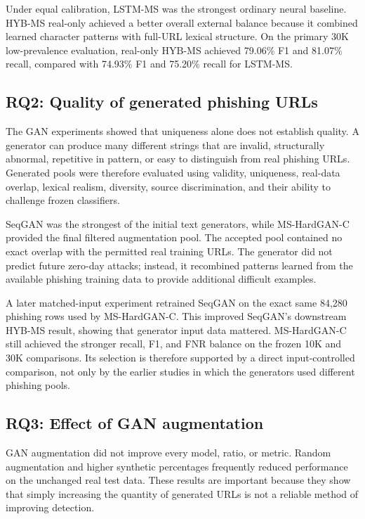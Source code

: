 Under equal calibration, LSTM-MS was the strongest ordinary neural baseline.
HYB-MS real-only achieved a better overall external balance because it combined
learned character patterns with full-URL lexical structure. On the primary
30K low-prevalence evaluation, real-only HYB-MS achieved 79.06\% F1 and
81.07\% recall, compared with 74.93\% F1 and 75.20\% recall for LSTM-MS.

\subsection{RQ2: Quality of generated phishing URLs}

The GAN experiments showed that uniqueness alone does not establish quality.
A generator can produce many different strings that are invalid, structurally
abnormal, repetitive in pattern, or easy to distinguish from real phishing
URLs. Generated pools were therefore evaluated using validity, uniqueness,
real-data overlap, lexical realism, diversity, source discrimination, and
their ability to challenge frozen classifiers.

SeqGAN was the strongest of the initial text generators, while MS-HardGAN-C
provided the final filtered augmentation pool. The accepted pool contained no
exact overlap with the permitted real training URLs. The generator did not
predict future zero-day attacks; instead, it recombined patterns learned from
the available phishing training data to provide additional difficult examples.

A later matched-input experiment retrained SeqGAN on the exact same 84,280
phishing rows used by MS-HardGAN-C. This improved SeqGAN's downstream HYB-MS
result, showing that generator input data mattered. MS-HardGAN-C still achieved
the stronger recall, F1, and FNR balance on the frozen 10K and 30K comparisons.
Its selection is therefore supported by a direct input-controlled comparison,
not only by the earlier studies in which the generators used different
phishing pools.

\subsection{RQ3: Effect of GAN augmentation}

GAN augmentation did not improve every model, ratio, or metric. Random
augmentation and higher synthetic percentages frequently reduced performance
on the unchanged real test data. These results are important because they show
that simply increasing the quantity of generated URLs is not a reliable method
of improving detection.

